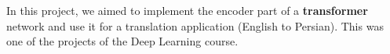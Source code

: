 \item{In this project, we aimed to implement the encoder part of a \textbf{transformer} network and use it for a translation application (English to Persian). This was one of the projects of the Deep Learning course.}

